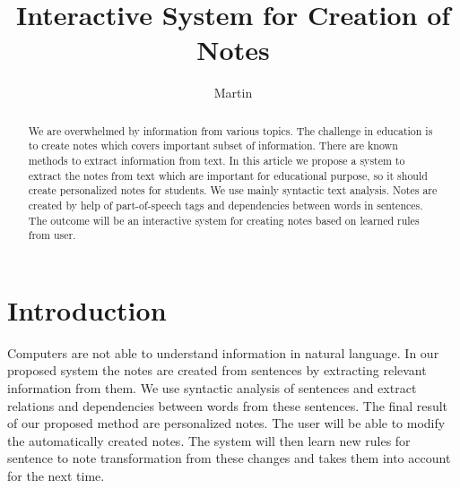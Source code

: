 \documentclass{iitsrc}
\title{Interactive System for Creation of Notes}
\author{Martin}{Nemček}
\begin{document}
\begin{abstract}
	We are overwhelmed by information from various topics. The challenge in education is to create notes which covers important subset of information. There are known methods to extract information from text. In this article we propose a system to extract the notes from text which are important for educational purpose, so it should create personalized notes for students. We use mainly syntactic text analysis. Notes are created by help of part-of-speech tags and dependencies between words in sentences. The outcome will be an interactive system for creating notes based on learned rules from user.
\end{abstract}

\section{Introduction} \label{introduction}
	
	
	Computers are not able to understand information in natural language. In our proposed system the notes are created from sentences by extracting relevant information from them. We use syntactic analysis of sentences and extract relations and dependencies between words from these sentences. The final result of our proposed method are personalized notes. The user will be able to modify the automatically created notes. The system will then learn new rules for sentence to note transformation from these changes and takes them into account for the next time.
	
\end{document}
